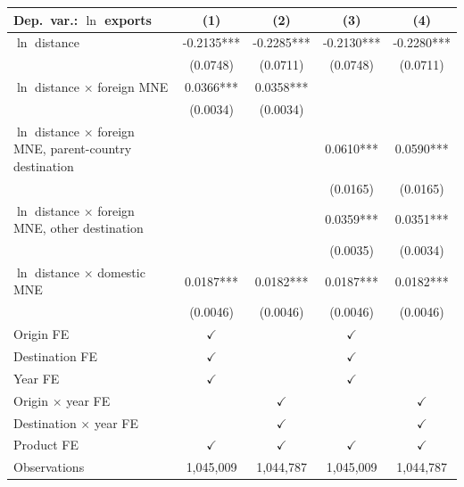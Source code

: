 \begin{tabular}{lcccc} \hline
Dep.\ var.: $\ln$ exports & (1) & (2) & (3) & (4) \\ \hline
$\ln$ distance & -0.2135*** & -0.2285*** & -0.2130*** & -0.2280*** \\
 & (0.0748) & (0.0711) & (0.0748) & (0.0711) \\
$\ln$ distance $\times$ foreign MNE & 0.0366*** & 0.0358*** &  &  \\
 & (0.0034) & (0.0034) &  &  \\
$\ln$ distance $\times$ foreign MNE, parent-country destination &  &  & 0.0610*** & 0.0590*** \\
 &  &  & (0.0165) & (0.0165) \\
$\ln$ distance $\times$ foreign MNE, other destination &  &  & 0.0359*** & 0.0351*** \\
 &  &  & (0.0035) & (0.0034) \\
$\ln$ distance $\times$ domestic MNE & 0.0187*** & 0.0182*** & 0.0187*** & 0.0182*** \\
 & (0.0046) & (0.0046) & (0.0046) & (0.0046) \\
\hline
Origin FE & $\checkmark$ &  & $\checkmark$ &  \\
Destination FE & $\checkmark$ &  & $\checkmark$ &  \\
Year FE & $\checkmark$ &  & $\checkmark$ &  \\
Origin $\times$ year FE &  & $\checkmark$ &  & $\checkmark$ \\
Destination $\times$ year FE &  & $\checkmark$ &  & $\checkmark$ \\
Product FE & $\checkmark$ & $\checkmark$ & $\checkmark$ & $\checkmark$ \\
\hline
Observations & 1,045,009 & 1,044,787 & 1,045,009 & 1,044,787 \\
\hline
\end{tabular}
